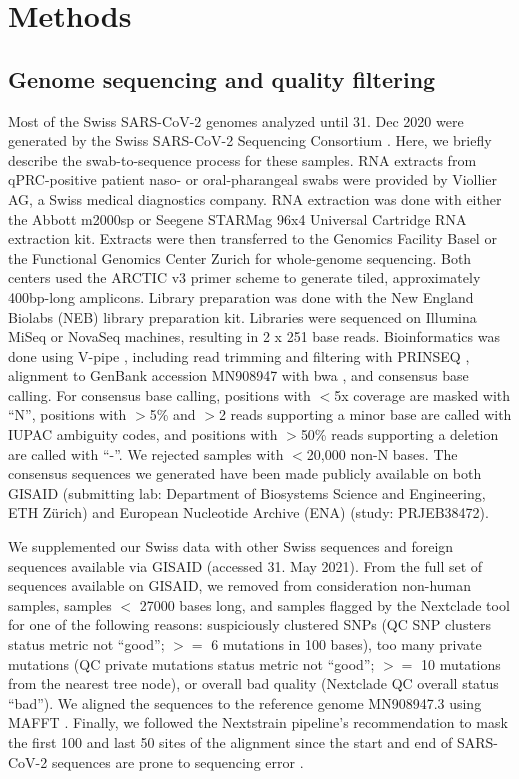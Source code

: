 \documentclass[11pt,twoside,lineno]{pnas-new} %
\begin{document}
\section{Methods}
\subsection*{Genome sequencing and quality filtering}
Most of the Swiss SARS-CoV-2 genomes analyzed until 31. Dec 2020 were generated by the Swiss SARS-CoV-2 Sequencing Consortium \cite{s3c-webpage}. Here, we briefly describe the swab-to-sequence process for these samples. RNA extracts from qPRC-positive patient naso- or oral-pharangeal swabs were provided by Viollier AG, a Swiss medical diagnostics company. RNA extraction was done with either the Abbott m2000sp or Seegene STARMag 96x4 Universal Cartridge RNA extraction kit. Extracts were then  transferred to the Genomics Facility Basel or the Functional Genomics Center Zurich for whole-genome sequencing. Both centers used the ARCTIC v3 primer scheme \cite{Quick2017, ARCTICNetwork} to generate tiled, approximately 400bp-long amplicons. Library preparation was done with the New England Biolabs (NEB) library preparation kit. Libraries were sequenced on Illumina MiSeq or NovaSeq machines, resulting in 2 x 251 base reads. Bioinformatics was done using V-pipe \cite{v-pipe-bioinformatics}, including read trimming and filtering with PRINSEQ \cite{Schmieder2011}, alignment to GenBank accession MN908947 \cite{Wu2020} with bwa \cite{Li2009}, and consensus base calling. For consensus base calling, positions with $<$5x coverage are masked with ``N'', positions with $>$5\% and $>$2 reads supporting a minor base are called with IUPAC ambiguity codes, and positions with $>$50\% reads supporting a deletion are called with ``-''. We rejected samples with $<$20,000 non-N bases. The consensus sequences we generated have been made publicly available on both GISAID (submitting lab: Department of Biosystems Science and Engineering, ETH Zürich) and European Nucleotide Archive (ENA) (study: PRJEB38472).

We supplemented our Swiss data with other Swiss sequences and foreign sequences available via GISAID (accessed 31. May 2021). From the full set of sequences available on GISAID, we removed from consideration non-human samples, samples $<$ 27000 bases long, and samples flagged by the Nextclade tool \cite{Aksamentov} for one of the following reasons: suspiciously clustered SNPs (QC SNP clusters status metric not ``good''; $>=$ 6 mutations in 100 bases), too many private mutations (QC private mutations status metric not ``good''; $>=$ 10 mutations from the nearest tree node), or overall bad quality (Nextclade QC overall status ``bad''). We aligned the sequences to the reference genome MN908947.3 using MAFFT \cite{katoh_mafft:_2002}. Finally, we followed the Nextstrain pipeline's recommendation to mask the first 100 and last 50 sites of the alignment \cite{Nextstraina} since the start and end of SARS-CoV-2 sequences are prone to sequencing error \cite{DeMaio2020}.
\end{document}
